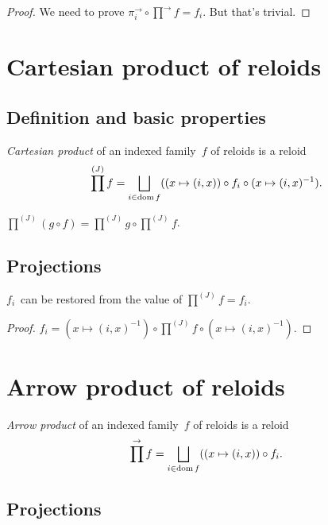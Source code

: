 \begin{proof}
We need to prove $\pi^{\rightarrow}_i\circ\prod^{\rightarrow}f=f_i$. But that's trivial.
\end{proof}

\section{Cartesian product of reloids}

\subsection{Definition and basic properties}

\begin{defn}
\emph{Cartesian product} of an indexed family~$f$ of reloids is
a reloid \[ \prod^{(J)} f=\bigsqcup_{i\in\dom f}((x\mapsto(i,x))\circ f_i\circ(x\mapsto(i,x)^{-1}). \]
\end{defn}

\begin{conjecture}
$\prod^{(J)}(g\circ f)=\prod^{(J)}g\circ\prod^{(J)}f$.
\end{conjecture}

\subsection{Projections}

\begin{thm}
$f_i$~can be restored from the value of $\prod^{(J)}f=f_i$.
\end{thm}

\begin{proof}
$f_i = (x\mapsto(i,x)^{-1})\circ\prod^{(J)}f\circ(x\mapsto(i,x)^{-1})$.
\end{proof}

\section{Arrow product of reloids}

\begin{defn}
\emph{Arrow product} of an indexed family~$f$ of reloids is
a reloid \[ \prod^{\rightarrow} f=\bigsqcup_{i\in\dom f}((x\mapsto(i,x))\circ f_i. \]
\end{defn}

\subsection{Projections}

